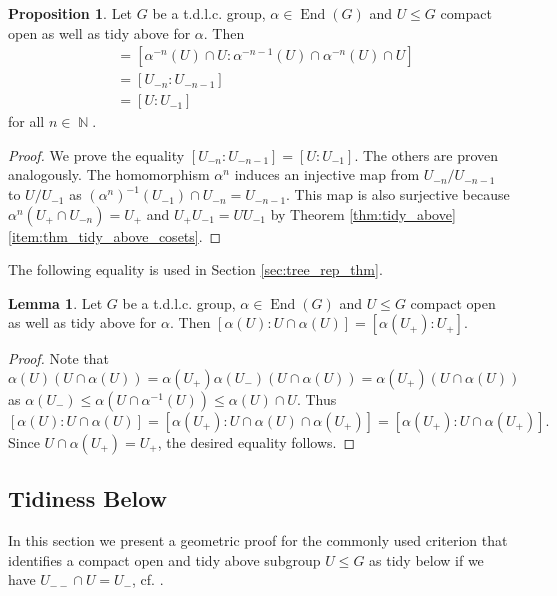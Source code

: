\documentclass{article}
\DeclareMathOperator\End{End}
\DeclareMathOperator\bbN{\mathbb{N}}
\theoremstyle{definition}
\newtheorem{lemma}[theorem]{Lemma}
\newtheorem{proposition}[theorem]{Proposition}
\begin{document}
\begin{proposition}\label{prop:out_index}
Let $G$ be a t.d.l.c. group, $\alpha\in\End(G)$ and $U\le G$ compact open as well as tidy above for $\alpha$. Then 
\begin{align*}
[\alpha^{-n}(U):\alpha^{-n-1}(U)\cap\alpha^{-n}(U)] & =[\alpha^{-n}(U)\cap U:\alpha^{-n-1}(U)\cap\alpha^{-n}(U)\cap U] \\
& = [U_{-n}:U_{-n-1}]\\
& = [U:U_{-1}]
\end{align*}
for all $n\in\bbN$.
\end{proposition}
\begin{proof}
We prove the equality $[U_{-n}:U_{-n-1}]=[U:U_{-1}]$. The others are proven analogously. The homomorphism $\alpha^{n}$ induces an injective map from $U_{-n}/U_{-n-1}$ to $U/U_{-1}$ as $(\alpha^{n})^{-1}(U_{-1})\cap U_{-n}=U_{-n-1}$. This map is also surjective because $\alpha^{n}(U_{+}\cap U_{-n})=U_{+}$ and $U_{+}U_{-1}=UU_{-1}$ by Theorem \ref{thm:tidy_above}\ref{item:thm_tidy_above_cosets}.
\end{proof}

The following equality is used in Section \ref{sec:tree_rep_thm}.

\begin{lemma}\label{lem:coset_calculations}
Let $G$ be a t.d.l.c. group, $\alpha\in\End(G)$ and $U\le G$ compact open as well as tidy above for $\alpha$. Then $[\alpha(U):U\cap \alpha(U)] = [\alpha(U_+):U_+]$.
\end{lemma}

\begin{proof}
Note that 
\begin{displaymath}
  \alpha(U)(U\cap \alpha(U)) = \alpha(U_+)\alpha(U_-)(U\cap \alpha(U)) = \alpha(U_+)(U\cap \alpha(U))
\end{displaymath}
as $\alpha(U_-)\le \alpha(U\cap \alpha^{-1}(U))\le \alpha(U)\cap U$. Thus 
\[[\alpha(U):U\cap \alpha(U)] = [\alpha(U_+):U\cap \alpha(U)\cap \alpha(U_+)] = [\alpha(U_+):U\cap\alpha(U_+)].\]
Since $U\cap\alpha(U_+) = U_+$, the desired equality follows.
\end{proof}

\subsection{Tidiness Below}
In this section we present a geometric proof for the commonly used criterion that identifies a compact open and tidy above subgroup $U\le G$ as tidy below if we have $U_{--}\cap U=U_{-}$, cf. \cite[Proposition 8]{Wil15}.
\end{document}
